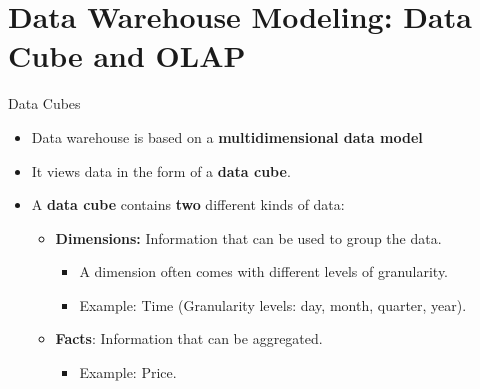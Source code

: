 \section{Data Warehouse Modeling: Data Cube and OLAP}


\begin{frame}{Data Cubes}
	\begin{itemize}
		\item Data warehouse is based on a \textbf{\color{airforceblue}multidimensional data model}
		\item It views data in the form of a \textbf{data cube}.
		\item A {\color{faugray}\textbf{data cube}} contains \textbf{two} different kinds of data:
		      \begin{itemize}
			      \item \textbf{Dimensions:} Information that can be used to group the data.
			            \begin{itemize}
				            \item A dimension often comes with different levels of granularity.
				            \item Example: Time (Granularity levels: day, month, quarter, year).
			            \end{itemize}
			      \item \textbf{Facts}: Information that can be aggregated.
			            \begin{itemize}
				            \item Example: Price.
			            \end{itemize}
		      \end{itemize}
	\end{itemize}
\end{frame}

